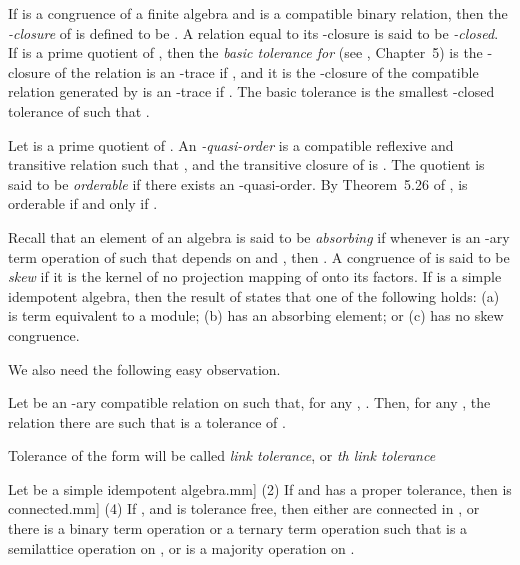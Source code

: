 \documentclass[11pt]{article}
\begin{document}
If  is a congruence of a finite algebra  and  is a
compatible binary relation, then the {\em -closure} of  is
defined to be . A relation equal to its
-closure is said to be {\em -closed}. If  is a prime
quotient of , then the {\em basic tolerance for}  (see
\cite{Hobby88:structure}, Chapter~5) is the -closure of the
relation  is an -trace 
if , and it is the
-closure of the compatible relation generated by
 is an -trace if
. The basic tolerance is the
smallest -closed tolerance  of  such that
. 

Let  is a prime quotient of . An {\em
-quasi-order} is a compatible reflexive and
transitive relation  such that , and the
transitive closure of  is . The quotient
 is said to be {\em orderable} if there exists an
-quasi-order. By Theorem~5.26 of
\cite{Hobby88:structure},  is 
orderable if and only if .

Recall that an element  of an algebra 
is said to be {\em absorbing} if whenever  is an
-ary term operation of  such that  depends on  and
, then . A congruence  of 
 is said to be {\em skew} if it is the kernel of no projection
mapping of  onto its factors. If  is a simple idempotent
algebra, then the result of \cite{Kearnes96:idempotent} states that
one of the following holds: (a)  is term equivalent to a module;
(b)  has an absorbing element; or (c)  has no skew
congruence. 

We also need the following easy observation.
\begin{lemma}\label{lem:binary-tol}
Let  be an -ary compatible relation on  such that, for
any , . Then, for any ,
the relation  there are  such that  is a tolerance of .
\end{lemma}

Tolerance of the form  will be called \emph{link tolerance}, or
\emph{th link tolerance}
\begin{prop}\label{pro:simple}
Let  be a simple idempotent algebra.\2mm]
(2) If  and  has a proper tolerance,
then  is connected.\2mm]
(4) If ,  and  is tolerance free,
then either  are connected in , or there is a binary
term operation  or a ternary term operation  such that  
is a semilattice operation on , or  is a majority operation
on .
\end{prop}
\end{document}
